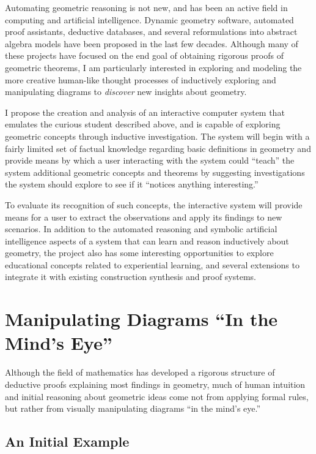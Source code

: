 Automating geometric reasoning is not new, and has been an active
field in computing and artificial intelligence.  Dynamic geometry
software, automated proof assistants, deductive databases, and several
reformulations into abstract algebra models have been proposed in the
last few decades.  Although many of these projects have focused on the
end goal of obtaining rigorous proofs of geometric theorems, I am
particularly interested in exploring and modeling the more creative
human-like thought processes of inductively exploring and manipulating
diagrams to \emph{discover} new insights about geometry.

I propose the creation and analysis of an interactive computer system
that emulates the curious student described above, and is capable of
exploring geometric concepts through inductive investigation.  The
system will begin with a fairly limited set of factual knowledge
regarding basic definitions in geometry and provide means by which a
user interacting with the system could ``teach'' the system additional
geometric concepts and theorems by suggesting investigations the
system should explore to see if it ``notices anything interesting.''

To evaluate its recognition of such concepts, the interactive system
will provide means for a user to extract the observations and apply
its findings to new scenarios.  In addition to the automated reasoning
and symbolic artificial intelligence aspects of a system that can
learn and reason inductively about geometry, the project also has some
interesting opportunities to explore educational concepts related to
experiential learning, and several extensions to integrate it with
existing construction synthesis and proof systems.

\section{Manipulating Diagrams ``In the Mind's Eye''}

Although the field of mathematics has developed a rigorous structure
of deductive proofs explaining most findings in geometry, much of
human intuition and initial reasoning about geometric ideas come not
from applying formal rules, but rather from visually manipulating
diagrams ``in the mind's eye.''


\subsection{An Initial Example}



